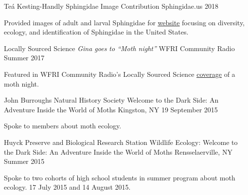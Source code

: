 \begin{cventries}
  \cventry
    {Teá Kesting-Handly} %
    {Sphingidae Image Contribution} %
    {Sphingidae.us} %
    {2018} %
    {
      \begin{cvitems} %
        \item {Provided images of adult and larval Sphingidae for \href{sphingidae.us}{\underline{website}} focusing on diversity, ecology, and identification of Sphingidae in the United States.}
      \end{cvitems}
    }

  \cventry
    {Locally Sourced Science} %
    {\emph{Gina goes to “Moth night”}} %
    {WFRI Community Radio} %
    {Summer 2017} %
    {
      \begin{cvitems} %
        \item {Featured in WFRI Community Radio’s Locally Sourced Science \href{https://www.mixcloud.com/Locally_Sourced_Science/ep-16-lss-tours-cornells-lake-source-cooling-plant-with-lanny-joyce-gina-goes-to-moth-night/}{\underline{coverage}} of a moth night.}
      \end{cvitems}
    }

  \cventry
    {John Burroughs Natural History Society} %
    {Welcome to the Dark Side: An Adventure Inside the World of Moths} %
    {Kingston, NY} %
    {19 September 2015} %
    {
      \begin{cvitems} %
        \item {Spoke to members about moth ecology.}
      \end{cvitems}
    }

  \cventry
    {Huyck Preserve and Biological Research Station} %
    {Wildlife Ecology: Welcome to the Dark Side: An Adventure Inside the World of Moths} %
    {Rensselaerville, NY} %
    {Summer 2015} %
    {
      \begin{cvitems} %
        \item {Spoke to two cohorts of high school students in summer program about moth ecology. 17 July 2015 and 14 August 2015.}
      \end{cvitems}
    }


\end{cventries}
